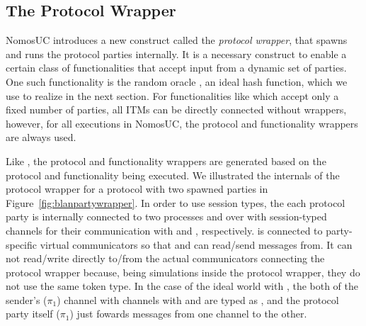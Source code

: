 
\subsection{The Protocol Wrapper}
NomosUC introduces a new construct called the \textit{protocol wrapper}, that spawns and runs the protocol parties internally.
It is a necessary construct to enable a certain class of functionalities that accept input from a dynamic set of parties. One such functionality is the random oracle \Fro, an ideal hash function, which we use to realize \Fcom in the next section.
For functionalities like \Fcom which accept only a fixed number of parties, all ITMs can be directly connected without wrappers, however, for all executions in NomosUC, the protocol and functionality wrappers are always used.

Like , the protocol and functionality wrappers are generated based on the protocol and functionality being executed.
We illustrated the internals of the protocol wrapper for a protocol with two spawned parties in Figure~\ref{fig:blanpartywrapper}.
In order to use session types, the each protocol party is internally connected to two processes  and  over with session-typed channels for their communication with \Z and \F, respectively.
 is connected to party-specific virtual communicators so that  and  can read/send messages from. It can not read/write directly to/from the actual communicators connecting the protocol wrapper because, being simulations inside the protocol wrapper, they do not use the same token type.
In the case of the ideal world with \Fcom, the both of the sender's ($\pi_1$) channel with  channels with  and  are typed as , and the protocol party itself ($\pi_1$) just fowards messages from one channel to the other.

